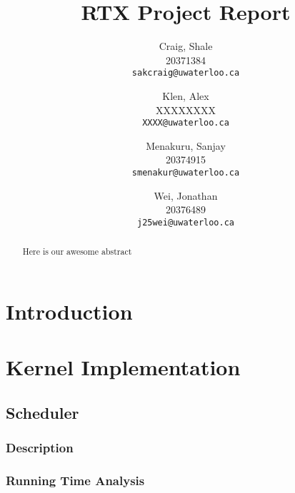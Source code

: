 \documentclass[12pt]{report}
\begin{document}

\title{RTX Project Report}

\author{
    Craig, Shale\\
    20371384\\
    \texttt{sakcraig@uwaterloo.ca}
    \and
    Klen, Alex\\
    XXXXXXXX\\
    \texttt{XXXX@uwaterloo.ca}
    \and
    Menakuru, Sanjay\\
    20374915\\
    \texttt{smenakur@uwaterloo.ca}
    \and
    Wei, Jonathan\\
    20376489\\
    \texttt{j25wei@uwaterloo.ca}
}

\maketitle

\begin{abstract}
    Here is our awesome abstract
\end{abstract}

\tableofcontents
\listofalgorithms



\part{Introduction}

\part{Kernel Implementation}

\chapter{Scheduler}

\section{Description}

\section{Running Time Analysis}
\end{document}
